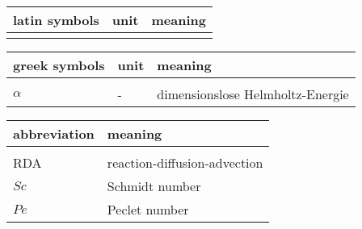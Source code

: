 \documentclass[../thesis.tex]{subfiles}
\begin{document}
	

\renewcommand*{\arraystretch}{1.2}
\small
\begin{tabular}{p{4cm}p{3cm}p{8cm}}
	latin symbols & unit & meaning \\ 
	\hline \\[\dimexpr-\normalbaselineskip+2pt]
	
\end{tabular}
\vspace{1cm}

\small
\begin{tabular}{p{4cm}p{3cm}p{8cm}}
	greek symbols & unit & meaning \\
	\hline \\[\dimexpr-\normalbaselineskip+2pt] 
	$\alpha$ & - & dimensionslose Helmholtz-Energie \\
\end{tabular}

\small
\begin{tabular}{p{4cm}p{8cm}}
	abbreviation & meaning \\
	\hline \\[\dimexpr-\normalbaselineskip+2pt] 
	RDA & reaction-diffusion-advection \\
	$Sc$ & Schmidt number \\
	$Pe$ & Peclet number \\
\end{tabular}

\listoffigures
\listoftables
\end{document}
